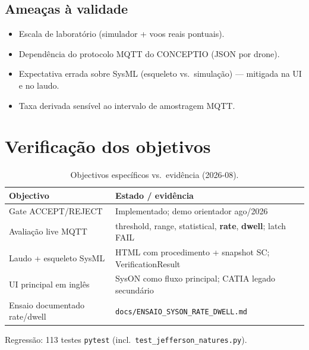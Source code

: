 \subsection{Ameaças à validade}

\begin{itemize}
  \item Escala de laboratório (simulador + voos reais pontuais).
  \item Dependência do protocolo MQTT do CONCEPTIO (JSON por drone).
  \item Expectativa errada sobre SysML (esqueleto vs.\ simulação) --- mitigada
        na UI e no laudo.
  \item Taxa derivada sensível ao intervalo de amostragem MQTT.
\end{itemize}

\section{Verificação dos objetivos}
\label{sec:objetivos-fechados}

\begin{table}[htbp]
  \centering
  \caption{Objectivos específicos vs.\ evidência (2026-08).}
  \label{tab:objetivos}
  \begin{tabular}{@{}lp{7.2cm}@{}}
    \toprule
    Objectivo & Estado / evidência \\
    \midrule
    Gate ACCEPT/REJECT & Implementado; demo orientador ago/2026 \\
    Avaliação live MQTT & threshold, range, statistical, \textbf{rate}, \textbf{dwell}; latch FAIL \\
    Laudo + esqueleto SysML & HTML com procedimento + snapshot SC; VerificationResult \\
    UI principal em inglês & SysON como fluxo principal; CATIA legado secundário \\
    Ensaio documentado rate/dwell & \texttt{docs/ENSAIO\_SYSON\_RATE\_DWELL.md} \\
    \bottomrule
  \end{tabular}
\end{table}

Regressão: 113 testes \texttt{pytest} (incl.\ \texttt{test\_jefferson\_natures.py}).

